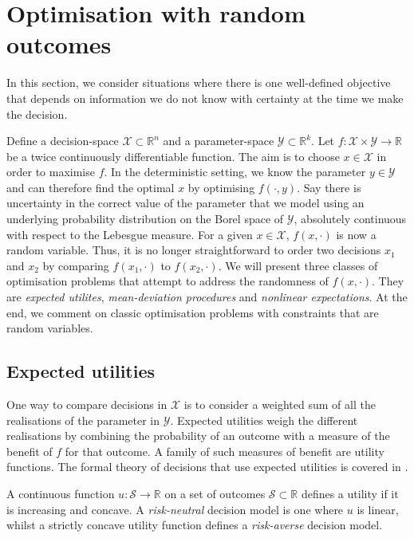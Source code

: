 \documentclass[main.tex]{subfiles}
\begin{document}
\section{Optimisation with random outcomes}\label{sec:one_optim_random_outcomes}
In this section, we consider situations where there is one
well-defined objective that depends on  information we do not know
with certainty at the time we make the decision.

Define a decision-space $\mathcal{X}\subset \mathbb{R}^n$ and a
parameter-space $\mathcal{Y}\subset \mathbb{R}^k$.
Let $f:\mathcal{X}\times\mathcal{Y}\to\mathbb{R}$ be a twice continuously
differentiable function.
The aim is to choose $x\in\mathcal{X}$ in order to maximise $f$.
In the deterministic setting, we know the parameter
$y\in\mathcal{Y}$ and can therefore find the optimal $x$ by optimising
$f(\cdot,y)$.
Say there is uncertainty in the correct value of the parameter that
we model using an underlying probability distribution
on the Borel space of $\mathcal{Y}$, absolutely continuous with respect
to the Lebesgue measure.
For a given $x\in\mathcal{X}$, $f(x,\cdot)$ is now a random variable.
Thus, it is no longer straightforward to order two decisions $x_1$ and
$x_2$ by comparing $f(x_1,\cdot)$ to $f(x_2,\cdot)$.
We will present three classes of optimisation problems that attempt to
address the randomness of $f(x,\cdot)$. They are \emph{expected
  utilites}, \emph{mean-deviation procedures} and \emph{nonlinear
  expectations}.
At the end, we comment on classic optimisation problems with constraints
that are random variables.

\subsection{Expected utilities}
One way to compare decisions in $\mathcal{X}$ is to consider a weighted
sum of all the realisations of the parameter in $\mathcal{Y}$.
Expected utilities weigh the different realisations by combining the
probability of an outcome with a measure of the benefit of $f$ for that
outcome.
A family of such measures of benefit are utility functions. The formal
theory of decisions that use expected utilities is covered in
\citep[Ch.~2]{follmer2004stochastic}.
\begin{mydef}
  A continuous function $u:\mathcal{S}\to\mathbb{R}$ on a set of outcomes
  $\mathcal{S}\subset \mathbb{R}$ defines a utility if
  it is increasing and concave.
  A \emph{risk-neutral} decision
  model is one where $u$ is linear, whilst a strictly concave utility function defines a
  \emph{risk-averse} decision model.
\end{mydef}
\end{document}
